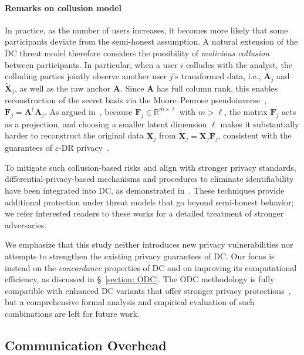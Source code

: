 \documentclass[final,3p,times]{elsarticle}
\theoremstyle{plain}
\newcommand{\matr}[1]{\bm{#1}}        %
\begin{document}
\paragraph{Remarks on collusion model}
In practice, as the number of users increases, it becomes more likely that some participants deviate from the semi-honest assumption. A natural extension of the DC threat model therefore considers the possibility of \emph{malicious collusion} between participants. In particular, when a user \(i\) colludes with the analyst, the colluding parties jointly observe another user \(j\)’s transformed data, i.e., \(\matr{A}_j\) and \(\tilde{\matr{X}}_j\), as well as the raw anchor \(\matr{A}\). Since \(\matr{A}\) has full column rank, this enables reconstruction of the secret basis via the Moore–Penrose pseudoinverse~\cite{pseudoinverse}, \(\matr{F}_j = \matr{A}^\dagger \matr{A}_j\). As argued in~\cite{DCprivacy}, because \(\matr{F}_j \in \mathbb{R}^{m \times \ell}\) with \( m > \ell \), the matrix \(\matr{F}_j\) acts as a projection, and choosing a smaller latent dimension \(\ell\) makes it substantially harder to reconstruct the original data \(\matr{X}_j\) from \(\tilde{\matr{X}}_j = \matr{X}_j \matr{F}_j\), consistent with the guarantees of \(\varepsilon\)-DR privacy~\cite{DRprivacy}.

To mitigate such collusion-based risks and align with stronger privacy standards, differential-privacy-based mechanisms and procedures to eliminate identifiability have been integrated into DC, as demonstrated in~\cite{NRI-DC,DC-DP}. These techniques provide additional protection under threat models that go beyond semi-honest behavior; we refer interested readers to these works for a detailed treatment of stronger adversaries.

We emphasize that this study neither introduces new privacy vulnerabilities nor attempts to strengthen the existing privacy guarantees of DC. Our focus is instead on the \emph{concordance} properties of DC and on improving its computational efficiency, as discussed in \S~\ref{section: ODC}. The ODC methodology is fully compatible with enhanced DC variants that offer stronger privacy protections~\cite{NRI-DC,DC-DP}, but a comprehensive formal analysis and empirical evaluation of such combinations are left for future work.


\subsection{Communication Overhead}
\label{subsec:communication}
\end{document}
